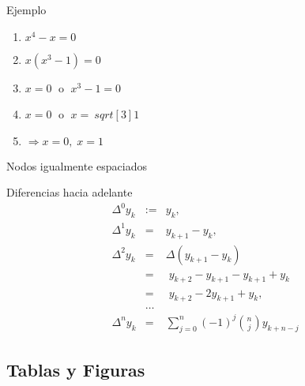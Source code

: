 \documentclass[11pt,a4paper]{beamer}
\begin{document}
\begin{frame}{Ejemplo}
\begin{enumerate}
\item <1-> $x^4-x=0$
\item <5-> $x(x^3-1) =0$
\item <2-> $x =0 \;$ o $\;x^3 -1=0$
\item <4-> $x =0 \;$ o $\;x=\ sqrt [3]{1}$
\item <3-> $\Longrightarrow x=0,\; x=1$
\end{enumerate}
\end{frame}

\begin{frame}{ Nodos igualmente espaciados}
\begin{block}{ Diferencias hacia adelante}
\begin{eqnarray*}
\Delta^0 y_k&:=&y_k,\\
\Delta^1 y_k&=&y_{k+1}-y_k,\\
\Delta^2 y_k&=&\Delta(y_{k+1}-y_k)\; \\
&=&\;y_{k+2}-y_{k+1}-y_{k+1}+y_k\; \\
&=&\;y_{k+2}-2y_{k+1}+y_k,\\
&\dots &\\
\Delta^n y_k&=&\sum_{j=0}^{n}(-1)^j\binom{n}{j}y_{k+n-j}
\end{eqnarray*}
\end{block}
\end{frame}

 
 
\subsection{Tablas y Figuras} %
 
\end{document}
